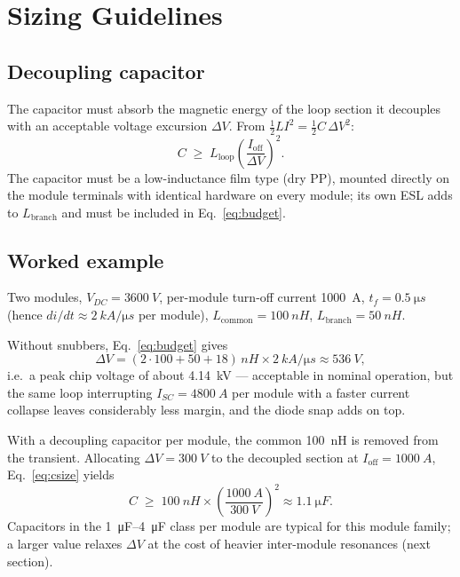 \documentclass[11pt,a4paper]{article}
\begin{document}
\section{Sizing Guidelines}
\subsection{Decoupling capacitor}
The capacitor must absorb the magnetic energy of the loop section it decouples with an
acceptable voltage excursion $\Delta V$. From
$\tfrac{1}{2} L I^2 = \tfrac{1}{2} C \,\Delta V^2$:
\begin{equation}
C \;\geq\; L_{\mathrm{loop}} \left(\frac{I_{\mathrm{off}}}{\Delta V}\right)^{2}.
\label{eq:csize}
\end{equation}
The capacitor must be a low-inductance film type (dry PP), mounted directly on the
module terminals with identical hardware on every module; its own ESL adds to
$L_{\mathrm{branch}}$ and must be included in Eq.~\eqref{eq:budget}.

\subsection{Worked example}
Two modules, $V_{DC} = \SI{3600}{V}$, per-module turn-off current \SI{1000}{A},
$t_f = \SI{0.5}{\micro s}$ (hence $di/dt \approx \SI{2}{kA\per\micro s}$ per module),
$L_{\mathrm{common}} = \SI{100}{nH}$, $L_{\mathrm{branch}} = \SI{50}{nH}$.

Without snubbers, Eq.~\eqref{eq:budget} gives
\begin{equation}
\Delta V = (2 \cdot 100 + 50 + 18)\,\si{nH} \times \SI{2}{kA\per\micro s}
\approx \SI{536}{V},
\end{equation}
i.e.\ a peak chip voltage of about \SI{4.14}{kV} --- acceptable in nominal operation,
but the same loop interrupting $I_{SC} = \SI{4800}{A}$ per module with a faster
current collapse leaves considerably less margin, and the diode snap adds on top.

With a decoupling capacitor per module, the common \SI{100}{nH} is removed from the
transient. Allocating $\Delta V = \SI{300}{V}$ to the decoupled section at
$I_{\mathrm{off}} = \SI{1000}{A}$, Eq.~\eqref{eq:csize} yields
\begin{equation}
C \;\geq\; \SI{100}{nH} \times \left(\frac{\SI{1000}{A}}{\SI{300}{V}}\right)^{2}
\approx \SI{1.1}{\micro F}.
\end{equation}
Capacitors in the \SIrange{1}{4}{\micro F} class per module are typical for this
module family; a larger value relaxes $\Delta V$ at the cost of heavier inter-module
resonances (next section).
\end{document}
